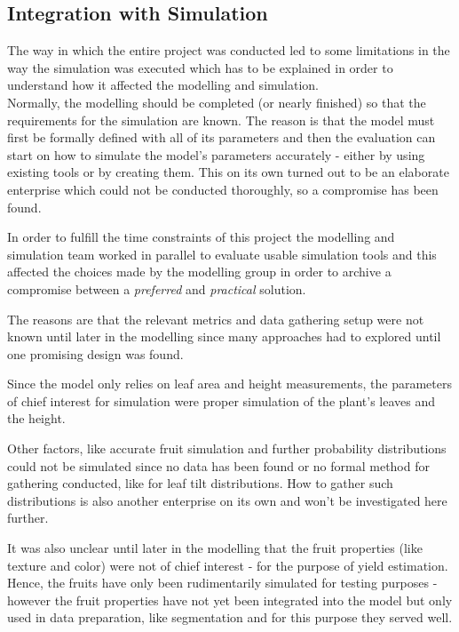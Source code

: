 \graphicspath{{members/ssr/figures/}}

\subsection{Integration with Simulation}\label{subsec:integration-with-simulation}

The way in which the entire project was conducted led to some limitations in the way the simulation was executed
which has to be explained in order to understand how it affected the modelling and simulation.\\

Normally, the modelling should be completed (or nearly finished) so that the requirements for the simulation are known.
The reason is that the model must first be formally defined with all of its parameters and then the evaluation can start
on how to simulate the model's parameters accurately - either by using existing tools or by creating them. 
This on its own turned out to be an elaborate enterprise which could not be conducted thoroughly, so a
compromise has been found.

In order to fulfill the time constraints of this project the modelling and simulation team worked in parallel
to evaluate usable simulation tools and this affected the choices made by the modelling group in order
to archive a compromise between a \textit{preferred} and \textit{practical} solution.

The reasons are that the relevant metrics and data gathering setup were not known until later in the modelling
since many approaches had to explored until one promising design was found.

Since the model only relies on leaf area and height measurements, the parameters of chief interest for simulation
were proper simulation of the plant's leaves and the height.

Other factors, like accurate fruit simulation and further probability distributions could not be simulated
since no data has been found or no formal method for gathering conducted, like for leaf tilt distributions.
How to gather such distributions is also another enterprise on its own and won't be investigated here
further.

It was also unclear until later in the modelling that the fruit properties (like texture and color)
were not of chief interest - for the purpose of yield estimation.
Hence, the fruits have only been rudimentarily simulated for testing purposes
- however the fruit properties have not yet been integrated into the model but only used in
data preparation, like segmentation and for this purpose they served well.\\

